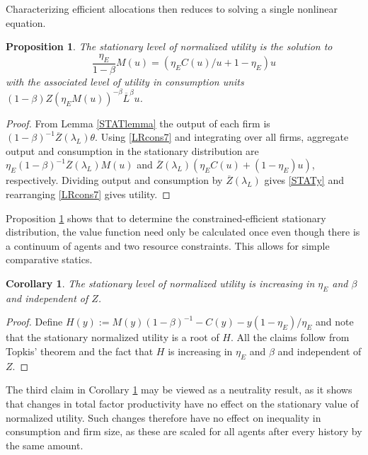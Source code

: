 \documentclass[11pt]{article}
\theoremstyle{plain}
\newtheorem{prop}[thm]{Proposition}
\newtheorem{corl}[thm]{Corollary}
\begin{document}
Characterizing efficient allocations then reduces to solving a single nonlinear equation. 
\begin{prop}\label{STAT1}
The stationary level of normalized utility is the solution to 
\begin{equation}
\frac{\eta_E}{1-\beta}M(u) = (\eta_EC(u)/u + 1 - \eta_E)u
\label{STATy}
\end{equation}
with the associated level of utility in consumption units $(1-\beta)Z(\eta_EM(u))^{-\beta}\overline{L}^{\beta}u$. 
\end{prop}
\begin{proof}
From Lemma \ref{STATlemma} the output of each firm is $(1-\beta)^{-1}\overline{Z}(\lambda_L)\theta$. Using \eqref{LRcons7} and integrating over all firms, aggregate output and consumption in the stationary distribution are $\eta_E(1-\beta)^{-1}\overline{Z}(\lambda_L)M(u)$ and $\overline{Z}(\lambda_L){\left(\eta_EC(u) + (1-\eta_E)u\right)}$, respectively. Dividing output and consumption by $\overline{Z}(\lambda_L)$ gives \eqref{STATy} and rearranging \eqref{LRcons7} gives utility. 
\end{proof}
Proposition \ref{STAT1} shows that to determine the constrained-efficient stationary distribution, the value function need only be calculated once even though there is a continuum of agents and two resource constraints. This allows for simple comparative statics. 
\begin{corl} \label{compstat3}
The stationary level of normalized utility is increasing in $\eta_E$ and $\beta$ and independent of $Z$.
\end{corl}
\begin{proof}
Define $H(y) :=  M(y)(1-\beta)^{-1} - C(y) - y(1-\eta_E)/\eta_E$ and note that the stationary normalized utility is a root of $H$. All the claims follow from Topkis' theorem and the fact that $H$ is increasing in $\eta_E$ and $\beta$ and independent of $Z$. 
\end{proof}
The third claim in Corollary \ref{compstat3} may be viewed as a neutrality result, as it shows that changes in total factor productivity have no effect on the stationary value of normalized utility. Such changes therefore have no effect on inequality in consumption and firm size, as these are scaled for all agents after every history by the same amount. 
\end{document}
